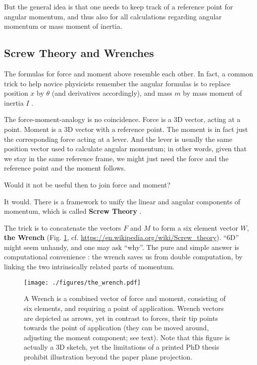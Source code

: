 But the general idea is that one needs to keep track of a reference point for angular momentum, and thus also for all calculations regarding angular momentum or mass moment of inertia.


\subsection{Screw Theory and Wrenches}
\label{sec:orgc5f418b}

The formulas for force and moment above resemble each other.
In fact, a common trick to help novice physicists remember the angular formulas is to replace position \(x\) by \(\theta\) (and derivatives accordingly), and mass \(m\) by mass moment of inertia \(I\) \citep{Tipler2007}.

The force-moment-analogy is no coincidence.
Force is a 3D vector, acting at a point.
Moment is a 3D vector with a reference point.
The moment is in fact just the corresponding force acting at a lever.
And the lever is usually the same position vector used to calculate angular momentum; in other words, given that we stay in the same reference frame, we might just need the force and the reference point and the moment follows.

Would it not be useful then to join force and moment?


It would.
There is a framework to unify the linear and angular components of momentum, which is called \textbf{Screw Theory} \citep{Ball1876,Lynch2017}.

The trick is to concatenate the vectors \(F\) and \(M\) to form a six element vector \(W\), \textbf{the Wrench} (Fig. \ref{fig:wrench}, cf. \url{https://en.wikipedia.org/wiki/Screw\_theory}).
``6D'' might seem unhandy, and one may ask ``why''.
The pure and simple answer is computational convenience \citep{Dumas2004,Mueller2018}: the wrench saves us from double computation, by linking the two intrinsically related parts of momentum.

\begin{figure}[p]
\centering
\texttt{[image: ./figures/the\_wrench.pdf]}
\caption{\label{fig:wrench}A Wrench is a combined vector of force and moment, consisting of six elements, and requiring a point of application. Wrench vectors are depicted as arrows, yet in contrast to forces, their tip points towards the point of application (they can be moved around, adjusting the moment component; see text). Note that this figure is actually a 3D sketch, yet the limitations of a printed PhD thesis prohibit illustration beyond the paper plane projection.}
\end{figure}


